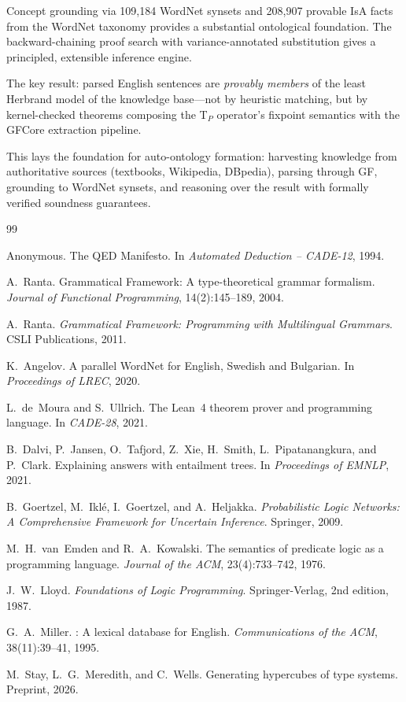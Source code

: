 \documentclass[]{article}
\begin{document}
Concept grounding via 109,184 WordNet synsets and 208,907 provable
IsA facts from the WordNet taxonomy provides a substantial ontological
foundation.  The backward-chaining proof search with variance-annotated
substitution gives a principled, extensible inference engine.

The key result: parsed English sentences are \emph{provably members}
of the least Herbrand model of the knowledge base---not by heuristic
matching, but by kernel-checked theorems composing the T$_P$ operator's
fixpoint semantics with the GFCore extraction pipeline.

This lays the foundation for auto-ontology formation: harvesting
knowledge from authoritative sources (textbooks, Wikipedia, DBpedia),
parsing through GF, grounding to WordNet synsets, and reasoning over
the result with formally verified soundness guarantees.

\begin{thebibliography}{99}

Anonymous.
\newblock The {QED} Manifesto.
\newblock In \emph{Automated Deduction -- CADE-12}, 1994.

A.~Ranta.
\newblock Grammatical Framework: A type-theoretical grammar formalism.
\newblock \emph{Journal of Functional Programming}, 14(2):145--189, 2004.

A.~Ranta.
\newblock \emph{Grammatical Framework: Programming with Multilingual Grammars}.
\newblock CSLI Publications, 2011.

K.~Angelov.
\newblock A parallel {WordNet} for {English}, {Swedish} and {Bulgarian}.
\newblock In \emph{Proceedings of LREC}, 2020.

L.~de~Moura and S.~Ullrich.
\newblock The {Lean}~4 theorem prover and programming language.
\newblock In \emph{CADE-28}, 2021.

B.~Dalvi, P.~Jansen, O.~Tafjord, Z.~Xie, H.~Smith, L.~Pipatanangkura, and P.~Clark.
\newblock Explaining answers with entailment trees.
\newblock In \emph{Proceedings of EMNLP}, 2021.

B.~Goertzel, M.~Ikl{\'e}, I.~Goertzel, and A.~Heljakka.
\newblock \emph{Probabilistic Logic Networks: A Comprehensive Framework for
  Uncertain Inference}.
\newblock Springer, 2009.

M.~H.~van~Emden and R.~A.~Kowalski.
\newblock The semantics of predicate logic as a programming language.
\newblock \emph{Journal of the ACM}, 23(4):733--742, 1976.

J.~W.~Lloyd.
\newblock \emph{Foundations of Logic Programming}.
\newblock Springer-Verlag, 2nd edition, 1987.

G.~A.~Miller.
: A lexical database for {English}.
\newblock \emph{Communications of the ACM}, 38(11):39--41, 1995.

M.~Stay, L.~G.~Meredith, and C.~Wells.
\newblock Generating hypercubes of type systems.
\newblock Preprint, 2026.

\end{thebibliography}
\end{document}
